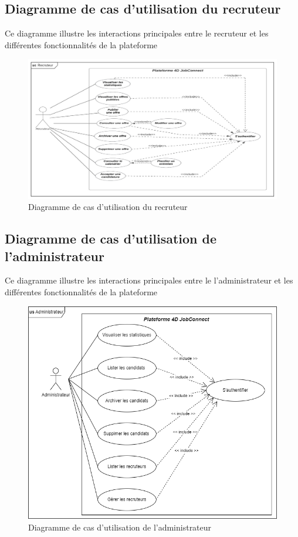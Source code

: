 \subsection{Diagramme de cas d’utilisation du recruteur}
Ce diagramme illustre les interactions principales entre le 
recruteur et les différentes fonctionnalités de la plateforme
\begin{figure}[h]
    \centering
    \includegraphics[scale=0.67]{Images/recruteur.jpg} %
    \caption{Diagramme de cas d’utilisation du recruteur}
    \label{fig:UCRecruteur}
\end{figure}
\vspace{12cm}

\subsection{Diagramme de cas d’utilisation de l'administrateur}
Ce diagramme illustre les interactions principales entre le 
l’administrateur et les différentes fonctionnalités de la plateforme
\begin{figure}[htbp]
    \centering
    \includegraphics[scale=0.7]{diag/adminUC.png} %
    \caption{Diagramme de cas d’utilisation de l'administrateur}
    \label{fig:UCAdmin}
\end{figure}
\vspace{1cm}


